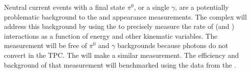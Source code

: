 Neutral current events with a final state $\pi^0$, or a single $\gamma$, are a potentially problematic background to the \nue and \anue appearance measurements. The   complex will address this background by using the  to precisely measure the rate of \nue (and \anue)  interactions as a function of energy and other kinematic variables. The measurement will be free of $\pi^0$ and $\gamma$ backgrounds because photons do not convert in the  TPC. The \larnd will make a similar measurement. The efficiency and background of that measurement will benchmarked using the data from the . 


